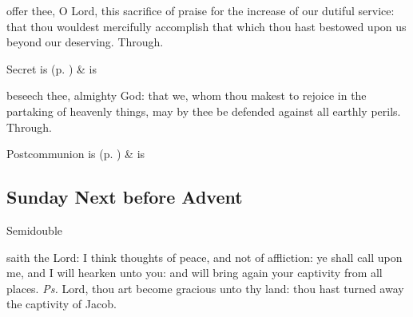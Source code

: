 
\vspace{-0.25\baselineskip}

\secret
{} offer thee, O Lord, this sacrifice of praise for the increase of our dutiful service: that thou wouldest mercifully accomplish that which thou hast bestowed upon us beyond our deserving. Through.
\begin{rubric}
     Secret is  (p. \pageref{SPSaints}) \&  is 
\end{rubric}


\vspace{-0.25\baselineskip}

\postcommunion
{} beseech thee, almighty God: that we, whom thou makest to rejoice in the partaking of heavenly things, may by thee be defended against all earthly perils. Through.
\begin{rubric}
     Postcommunion is  (p. \pageref{SPSaints}) \&  is 
\end{rubric}


\clearpage
\subsection{Sunday Next before Advent}
\begin{inhead}
{Semidouble}
\end{inhead}


\introit
{} saith the Lord: I think thoughts of peace, and not of affliction: ye shall call upon me, and I will hearken unto you: and will bring again your captivity from all places. \textit{Ps.} Lord, thou art become gracious unto thy land: thou hast turned away the captivity of Jacob.

